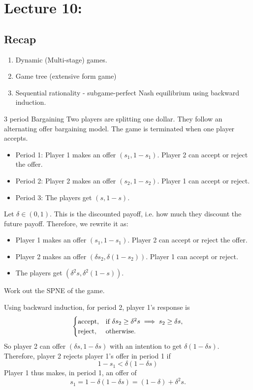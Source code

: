 \section{Lecture 10: }
\newsection
\subsection*{Recap}
\begin{enumerate}
    \item Dynamic (Multi-stage) games.
    \item Game tree (extensive form game)
    \item Sequential rationality - subgame-perfect Nash equilibrium using backward induction.
\end{enumerate}

\begin{aexample}{3 period Bargaining}{}
    Two players are splitting one dollar. 
    They follow an alternating offer bargaining model. The game is terminated when one player accepts.
    
    \begin{itemize}
        \item Period 1: Player 1 makes an offer $(s_1,1-s_1)$. Player 2 can accept or reject the offer.
        \item Period 2: Player 2 makes an offer $(s_2,1-s_2)$. Player 1 can accept or reject.
        \item Period 3: The players get $(s,1-s)$.
    \end{itemize}

    Let $\delta\in(0,1)$. This is the discounted payoff, i.e. how much they discount the future payoff. Therefore, we rewrite it as:
    \begin{itemize}
        \item [1:] Player 1 makes an offer $(s_1,1-s_1)$. Player 2 can accept or reject the offer.
        \item [2:] Player 2 makes an offer $(\delta s_2,\delta(1-s_2))$. Player 1 can accept or reject.
        \item [3:] The players get $(\delta^2 s,\delta^2(1-s))$.
    \end{itemize}
    Work out the SPNE of the game.
\end{aexample}
Using backward induction, for period 2, player 1's response is \[
\begin{cases}
    \rm{accept,} & \textrm{if }\delta s_2\geq \delta^2s\implies s_2\geq \delta s,\\
    \rm{reject,} & \textrm{otherwise.} 
\end{cases}
\]
So player 2 can offer $(\delta s, 1-\delta s)$ with an intention to get $\delta (1-\delta s)$.
Therefore, player 2 rejects player 1's offer in period 1 if \[
1-s_1<\delta (1-\delta s)
\]
Player 1 thus makes, in period 1, an offer of \[
s_1= 1-\delta(1-\delta s)=(1-\delta) + \delta^2 s.
\]

